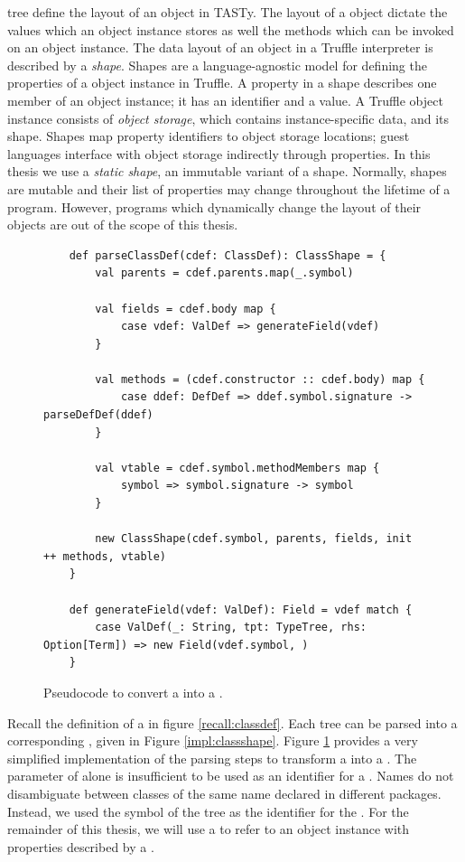  tree define the layout of an object in TASTy.
The layout of a object dictate the values which an object instance stores as well the methods which can be invoked on an object instance.
The data layout of an object in a Truffle interpreter is described by a \textit{shape}\cite{self:prototypes}\cite{truffle:object-model}.
Shapes are a language-agnostic model for defining the properties of a object instance in Truffle.
A property in a shape describes one member of an object instance; it has an identifier and a value.
A Truffle object instance consists of \textit{object storage}, which contains instance-specific data, and its shape.
Shapes map property identifiers to object storage locations; guest languages interface with object storage indirectly through properties.
In this thesis we use a \textit{static shape}, an immutable variant of a shape.
Normally, shapes are mutable and their list of properties may change throughout the lifetime of a program\cite{truffleruby:object-model}.
However, programs which dynamically change the layout of their objects\cite{java:reflection} are out of the scope of this thesis.

\begin{figure}[!htb]
	\begin{verbatim}
	def parseClassDef(cdef: ClassDef): ClassShape = {
		val parents = cdef.parents.map(_.symbol)
		
		val fields = cdef.body map {
			case vdef: ValDef => generateField(vdef)	
		}
		
		val methods = (cdef.constructor :: cdef.body) map {
			case ddef: DefDef => ddef.symbol.signature -> parseDefDef(ddef)
		}
		
		val vtable = cdef.symbol.methodMembers map {
			symbol => symbol.signature -> symbol
		}
	
		new ClassShape(cdef.symbol, parents, fields, init ++ methods, vtable)
	}

	def generateField(vdef: ValDef): Field = vdef match {
		case ValDef(_: String, tpt: TypeTree, rhs: Option[Term]) => new Field(vdef.symbol, )
	}
	\end{verbatim}
	\caption{Pseudocode to convert a  into a .}
	\label{impl:parse-classdef}
\end{figure}

Recall the definition of a  in figure \ref{recall:classdef}.
Each  tree can be parsed into a corresponding , given in Figure \ref{impl:classshape}.
Figure \ref{impl:parse-classdef} provides a very simplified implementation of the parsing steps to transform a  into a .
The  parameter of  alone is insufficient to be used as an identifier for a .
Names do not disambiguate between classes of the same name declared in different packages.
Instead, we used the symbol of the  tree as the identifier for the .
For the remainder of this thesis, we will use a  to refer to an object instance with properties described by a .

